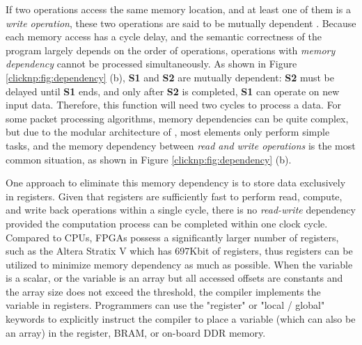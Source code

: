 If two operations access the same memory location, and at least one of them is a \textit{write operation}, these two operations are said to be mutually dependent \cite{dependence}.
Because each memory access has a cycle delay, and the semantic correctness of the program largely depends on the order of operations, operations with \textit{memory dependency} cannot be processed simultaneously.
As shown in Figure \ref{clicknp:fig:dependency} (b), \textbf{S1} and \textbf{S2} are mutually dependent: \textbf{S2} must be delayed until \textbf{S1} ends, and only after \textbf{S2} is completed, \textbf{S1} can operate on new input data.
Therefore, this function will need two cycles to process a data.
For some packet processing algorithms, memory dependencies can be quite complex, but due to the modular architecture of \name, most elements only perform simple tasks, and the memory dependency between \textit{read and write operations} is the most common situation, as shown in Figure \ref{clicknp:fig:dependency} (b).

One approach to eliminate this memory dependency is to store data exclusively in registers. Given that registers are sufficiently fast to perform read, compute, and write back operations within a single cycle, there is no \textit{read-write} dependency provided the computation process can be completed within one clock cycle. Compared to CPUs, FPGAs possess a significantly larger number of registers, such as the Altera Stratix V which has 697Kbit of registers, thus registers can be utilized to minimize memory dependency as much as possible. When the variable is a scalar, or the variable is an array but all accessed offsets are constants and the array size does not exceed the threshold, the \name compiler implements the variable in registers. Programmers can use the "register" or "local / global" keywords to explicitly instruct the compiler to place a variable (which can also be an array) in the register, BRAM, or on-board DDR memory.

